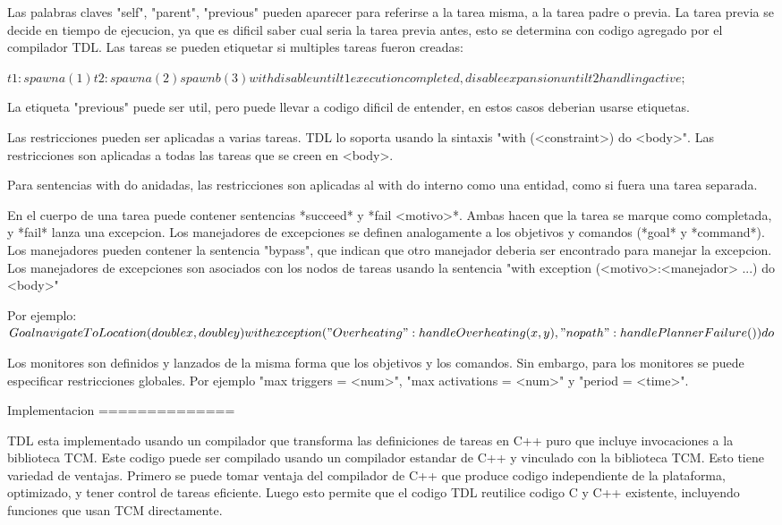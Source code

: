 \documentclass{article}
\begin{document}
Las palabras claves "self", "parent", "previous" pueden aparecer
para referirse a la tarea misma, a la tarea padre o previa.
La tarea previa se decide en tiempo de ejecucion, ya que es dificil
saber cual seria la tarea previa antes, esto se determina con codigo agregado
por el compilador TDL.
Las tareas se pueden etiquetar si multiples tareas fueron creadas:

$
t1: spawn a(1)
t2: spawn a(2)
spawn b(3) with
  disable until t1 execution completed,
  disable expansion until t2 handling active;
$

La etiqueta "previous" puede ser util, pero puede llevar a codigo dificil de 
entender, en estos casos deberian usarse etiquetas.

Las restricciones pueden ser aplicadas a varias tareas. TDL lo soporta
usando la sintaxis "with (<constraint>) do {<body>}".
Las restricciones son aplicadas a todas las tareas que se creen en <body>.

Para sentencias with do anidadas, las restricciones son aplicadas al 
with do interno como una entidad, como si fuera una tarea separada.

En el cuerpo de una tarea puede contener sentencias *succeed* y 
*fail <motivo>*.
Ambas hacen que la tarea se marque como completada, y *fail* lanza una 
excepcion.
Los manejadores de excepciones se definen analogamente a los objetivos y 
comandos (*goal* y *command*).
Los manejadores pueden contener la sentencia "bypass", que indican que otro
manejador deberia ser encontrado para manejar la excepcion.
Los manejadores de excepciones son asociados con los nodos de tareas usando
la sentencia "with exception (<motivo>:<manejador> ...) do {<body>}"

Por ejemplo:
$
Goal navigateToLocation(double x, double y) {
  with exception
    ("Overheating": handleOverheating(x, y),
     "no path": handlePlannerFailure()) do {

     }
}
$

Los monitores son definidos y lanzados de la misma forma que los objetivos
y los comandos.
Sin embargo, para los monitores se puede especificar restricciones globales.
Por ejemplo "max triggers = <num>", "max activations = <num>"
y "period = <time>".

Implementacion
==============

TDL esta implementado usando un compilador que transforma las definiciones
de tareas en C++ puro que incluye invocaciones a la biblioteca TCM.
Este codigo puede ser compilado usando un compilador estandar de C++ y
vinculado con la biblioteca TCM.
Esto tiene variedad de ventajas. Primero se puede tomar ventaja del
compilador de C++ que produce codigo independiente de la plataforma,
optimizado, y tener control de tareas eficiente.
Luego esto permite que el codigo TDL reutilice codigo C y C++ existente,
incluyendo funciones que usan TCM directamente.
\end{document}
